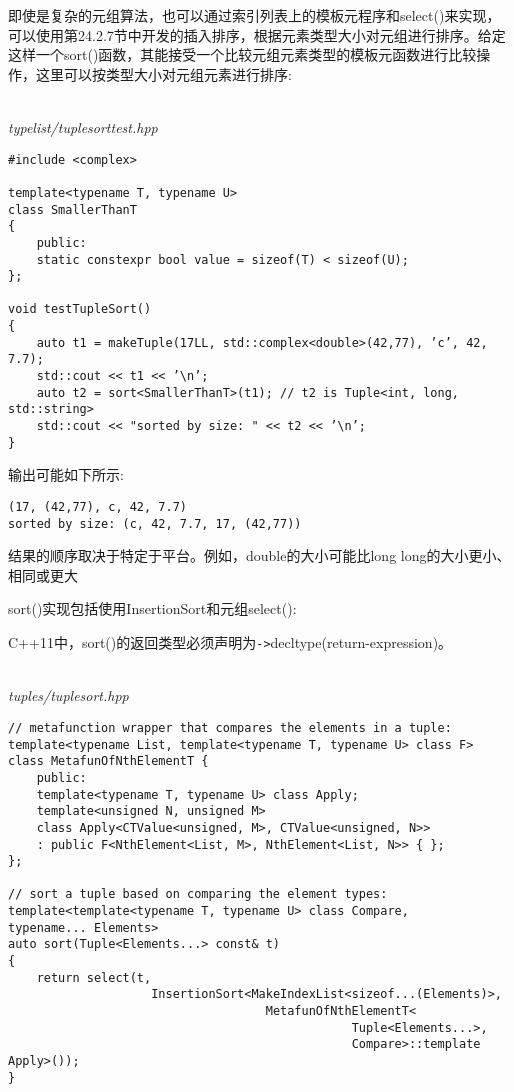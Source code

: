 即使是复杂的元组算法，也可以通过索引列表上的模板元程序和select()来实现，可以使用第24.2.7节中开发的插入排序，根据元素类型大小对元组进行排序。给定这样一个sort()函数，其能接受一个比较元组元素类型的模板元函数进行比较操作，这里可以按类型大小对元组元素进行排序:

\hspace*{\fill} \\ %
\noindent
\textit{typelist/tuplesorttest.hpp}
\begin{lstlisting}[style=styleCXX]
#include <complex>

template<typename T, typename U>
class SmallerThanT
{
	public:
	static constexpr bool value = sizeof(T) < sizeof(U);
};

void testTupleSort()
{
	auto t1 = makeTuple(17LL, std::complex<double>(42,77), ’c’, 42, 7.7);
	std::cout << t1 << ’\n’;
	auto t2 = sort<SmallerThanT>(t1); // t2 is Tuple<int, long, std::string>
	std::cout << "sorted by size: " << t2 << ’\n’;
}
\end{lstlisting}

输出可能如下所示:

\begin{lstlisting}[style=styleCXX]
(17, (42,77), c, 42, 7.7)
sorted by size: (c, 42, 7.7, 17, (42,77))
\end{lstlisting}

\begin{tcolorbox}[colback=webgreen!5!white,colframe=webgreen!75!black]
\hspace*{0.75cm}结果的顺序取决于特定于平台。例如，double的大小可能比long long的大小更小、相同或更大
\end{tcolorbox}

sort()实现包括使用InsertionSort和元组select():

\begin{tcolorbox}[colback=webgreen!5!white,colframe=webgreen!75!black]
\hspace*{0.75cm}C++11中，sort()的返回类型必须声明为\texttt{->}decltype(return-expression)。
\end{tcolorbox}

\hspace*{\fill} \\ %
\noindent
\textit{tuples/tuplesort.hpp}
\begin{lstlisting}[style=styleCXX]
// metafunction wrapper that compares the elements in a tuple:
template<typename List, template<typename T, typename U> class F>
class MetafunOfNthElementT {
	public:
	template<typename T, typename U> class Apply;
	template<unsigned N, unsigned M>
	class Apply<CTValue<unsigned, M>, CTValue<unsigned, N>>
	: public F<NthElement<List, M>, NthElement<List, N>> { };
};

// sort a tuple based on comparing the element types:
template<template<typename T, typename U> class Compare,
typename... Elements>
auto sort(Tuple<Elements...> const& t)
{
	return select(t,
					InsertionSort<MakeIndexList<sizeof...(Elements)>,
									MetafunOfNthElementT<
												Tuple<Elements...>,
												Compare>::template Apply>());
}
\end{lstlisting}

